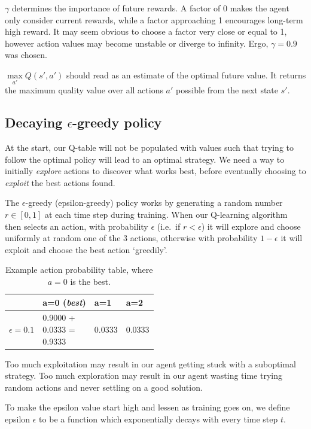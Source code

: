 \documentclass[a4paper]{report}
\begin{document}
$\gamma$ determines the importance of future rewards. A factor of 0 makes the agent only consider current rewards, while a factor approaching 1 encourages long-term high reward. It may seem obvious to choose a factor very close or equal to 1, however action values may become unstable or diverge to infinity. Ergo, $\gamma=0.9$ was chosen.

$\underset{a'}{\max} Q(s',a')$ should read as an estimate of the optimal future value. It returns the maximum quality value over all actions $a'$ possible from the next state $s'$.

\subsection{Decaying $\epsilon$-greedy policy}

At the start, our Q-table will not be populated with values such that trying to follow the optimal policy will lead to an optimal strategy. We need a way to initially \emph{explore} actions to discover what works best, before eventually choosing to \emph{exploit} the best actions found.

The $\epsilon$-greedy (epsilon-greedy) policy works by generating a random number $r\in[0,1]$ at each time step during training. When our Q-learning algorithm then selects an action, with probability $\epsilon$ (i.e.\ if $r < \epsilon$) it will explore and choose uniformly at random one of the 3 actions, otherwise with probability $1-\epsilon$ it will exploit and choose the best action `greedily'.

\begin{table}[H]
  \centering
  \begin{tabular}{c | l l l}
    \textbf{} & a=0 (\emph{best}) & a=1 & a=2 \\
    \hline
    $\epsilon=0.1$ & \makecell[l]{0.9000 +\\0.0333 =\\0.9333} & 0.0333 & 0.0333 \\
  \end{tabular}
  \caption{Example action probability table, where $a=0$ is the best.}
  \label{tab:action_probabilities}
\end{table}

Too much exploitation may result in our agent getting stuck with a suboptimal strategy. Too much exploration may result in our agent wasting time trying random actions and never settling on a good solution.

To make the epsilon value start high and lessen as training goes on, we define epsilon $\epsilon$ to be a function which exponentially decays with every time step $t$.
\end{document}
